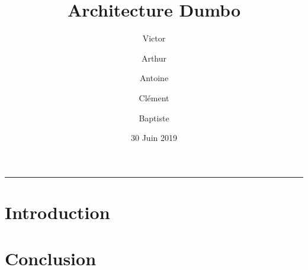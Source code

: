 \documentclass{article}
\title{Architecture Dumbo}
\date{30 Juin 2019}
\author{Victor \bsc{Zimmerman} \and Arthur \bsc{Bruneel} \and Antoine \bsc{Caillet} \and Clément \bsc{Boutin} \and Baptiste \bsc{Saclier}}
\begin{document}
\maketitle

\begin{center}
\rule{0.5\textwidth}{0.4pt}
\end{center}

\bigskip

\tableofcontents

\clearpage

\section{Introduction}




\section{Conclusion}
\end{document}

